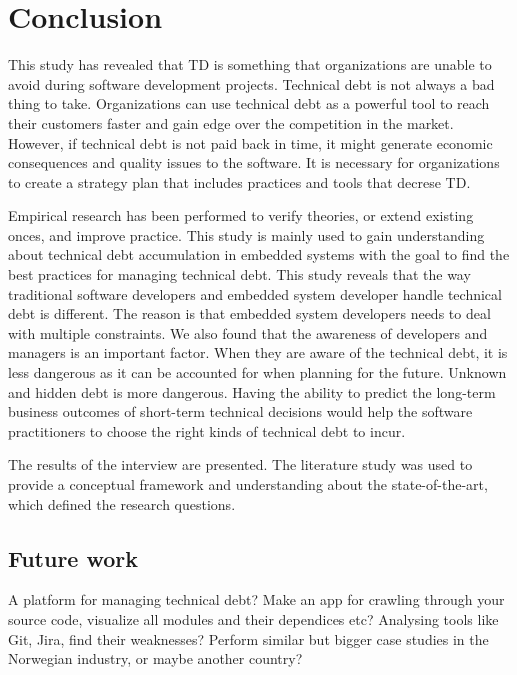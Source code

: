 



\chapter{Conclusion}
This study has revealed that TD is something that organizations are unable to avoid during software development projects. Technical debt is not always a bad thing to take. Organizations can use technical debt as a powerful tool to reach their customers faster and gain edge over the competition in the market. However, if technical debt is not paid back in time, it might generate economic consequences and quality issues to the software. It is necessary for organizations to create a strategy plan that includes practices and tools that decrese TD.

Empirical research has been performed to verify theories, or extend existing onces, and improve practice. This study is mainly used to gain understanding about technical debt accumulation in embedded systems with the goal to find the best practices for managing technical debt. This study reveals that the way traditional software developers and embedded system developer handle technical debt is different. The reason is that embedded system developers needs to deal with multiple constraints. We also found that the awareness of developers and managers is an important factor. When they are aware of the technical debt, it is less dangerous as it can be accounted for when planning for the future. Unknown and hidden debt is more dangerous. Having the ability to predict the long-term business outcomes of short-term technical decisions would help the software practitioners to choose the right kinds of technical debt to incur.

The results of the interview are presented. The literature study was used to provide a conceptual framework and understanding about the state-of-the-art, which defined the research questions.

\section{Future work}
A platform for managing technical debt? Make an app for crawling through your source code, visualize all modules and their dependices etc? Analysing tools like Git, Jira, find their weaknesses? Perform similar but bigger case studies in the Norwegian industry, or maybe another country?